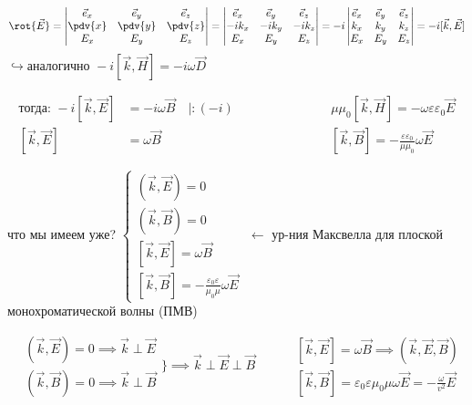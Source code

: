 \begin{equation*}
	\rot{\vec{E}} = \begin{vmatrix} 
		\vec{e}_x & \vec{e}_y & \vec{e}_z \\ 
		\pdv{x} & \pdv{y} & \pdv{z} \\ 
		E_x & E_y & E_z 
	\end{vmatrix} =
	\begin{vmatrix} 
		\vec{e}_x & \vec{e}_y & \vec{e}_z \\ 
		-ik_x & -ik_y & -ik_z \\ 
		E_x & E_y & E_z 
	\end{vmatrix} = -i
	\begin{vmatrix} 
		\vec{e}_x & \vec{e}_y & \vec{e}_z \\ 
		k_x & k_y & k_z \\ 
		E_x & E_y & E_z 
	\end{vmatrix} = -i [\vec{k}, \vec{E}]
\end{equation*}
$\hookrightarrow \text{аналогично } -i[\vec{k}, \vec{H}] = -i\omega\vec{D}$

\begin{equation*}
	\begin{aligned}
		\text{тогда: } -i [\vec{k}, \vec{E}] &= -i\omega\vec{B} \quad | : (-i) \quad\quad\quad\quad\quad\quad && \mu\mu_0[\vec{k}, \vec{H}] = -\omega\varepsilon\varepsilon_0\vec{E} \\
		[\vec{k}, \vec{E}] &= \omega\vec{B} && [\vec{k}, \vec{B}] = - \frac{\varepsilon\varepsilon_0}{\mu\mu_0} \omega\vec{E}
	\end{aligned}
\end{equation*}

что мы имеем уже? 
$\begin{cases}
	(\vec{k}, \vec{E}) = 0 \\
	(\vec{k}, \vec{B}) = 0 \\
	[\vec{k}, \vec{E}] = \omega\vec{B} \\
	[\vec{k}, \vec{B}] = - \frac{\varepsilon_0\varepsilon}{\mu_0\mu} \omega\vec{E}
\end{cases}$ $\longleftarrow$ ур-ния Максвелла для плоской монохроматической волны (ПМВ)

\begin{equation*}
	\begin{aligned}
		& (\vec{k}, \vec{E}) = 0 \implies \vec{k} \perp \vec{E} \\
		& (\vec{k}, \vec{B}) = 0 \implies \vec{k} \perp \vec{B}
	\end{aligned} \Bigg\} \implies \vec{k} \perp \vec{E} \perp \vec{B} \quad\quad 
	\begin{aligned}
		& [\vec{k}, \vec{E}] = \omega\vec{B} \implies (\vec{k}, \vec{E}, \vec{B}) \\
		& [\vec{k}, \vec{B}] = \varepsilon_0\varepsilon\mu_0\mu\omega\vec{E} = - \frac{\omega}{v^2}\vec{E}
	\end{aligned}
\end{equation*}

